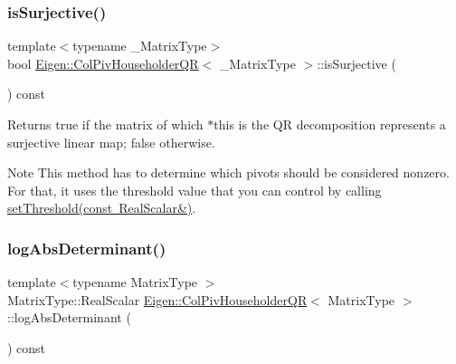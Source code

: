 \subsubsection{\texorpdfstring{isSurjective()}{isSurjective()}}
{\footnotesize\ttfamily template$<$typename \+\_\+\+Matrix\+Type$>$ \\
bool \mbox{\hyperlink{class_eigen_1_1_col_piv_householder_q_r}{Eigen\+::\+Col\+Piv\+Householder\+QR}}$<$ \+\_\+\+Matrix\+Type $>$\+::is\+Surjective (\begin{DoxyParamCaption}{ }\end{DoxyParamCaption}) const\hspace{0.3cm}{\ttfamily [inline]}}

\begin{DoxyReturn}{Returns}
true if the matrix of which $\ast$this is the QR decomposition represents a surjective linear map; false otherwise.
\end{DoxyReturn}
\begin{DoxyNote}{Note}
This method has to determine which pivots should be considered nonzero. For that, it uses the threshold value that you can control by calling \mbox{\hyperlink{class_eigen_1_1_col_piv_householder_q_r_ae712cdc9f0e521cfc8061bee58ff55ee}{set\+Threshold(const Real\+Scalar\&)}}. 
\end{DoxyNote}
\mbox{\label{class_eigen_1_1_col_piv_householder_q_r_afdc29438a335871f67449c253369ce12}} 
\subsubsection{\texorpdfstring{logAbsDeterminant()}{logAbsDeterminant()}}
{\footnotesize\ttfamily template$<$typename Matrix\+Type $>$ \\
Matrix\+Type\+::\+Real\+Scalar \mbox{\hyperlink{class_eigen_1_1_col_piv_householder_q_r}{Eigen\+::\+Col\+Piv\+Householder\+QR}}$<$ Matrix\+Type $>$\+::log\+Abs\+Determinant (\begin{DoxyParamCaption}{ }\end{DoxyParamCaption}) const}

